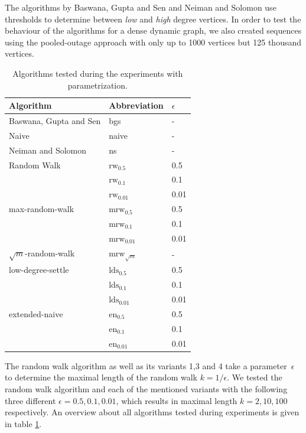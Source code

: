 \documentclass{article}      %
\begin{document}
The algorithms by Baswana, Gupta and Sen and Neiman and Solomon use thresholds to determine between \emph{low} and \emph{high} degree vertices. In order to test the behaviour of the algorithms for a dense dynamic graph, we also created sequences using the pooled-outage approach with only up to 1000 vertices but 125 thousand vertices. 

\begin{table}
	\centering
	\small
	\begin{tabular}{| l | l | l |}
		\hline
		Algorithm & Abbreviation & $\epsilon$ \\
		\hline
		\hline
		Baswana, Gupta and Sen & bgs & - \\
		Naive & naive & - \\
		Neiman and Solomon & ns & - \\
		Random Walk & $\mathrm{rw}_{0.5}$ & 0.5 \\
		 & $\mathrm{rw}_{0.1}$ & 0.1 \\
		 & $\mathrm{rw}_{0.01}$ & 0.01 \\
		max-random-walk & $\mathrm{mrw}_{0.5}$ & 0.5 \\
		 & $\mathrm{mrw}_{0.1}$ & 0.1 \\
		 & $\mathrm{mrw}_{0.01}$ & 0.01 \\
		$\sqrt{m}$-random-walk & $\mathrm{mrw}_{\sqrt{m}}$ & - \\
		low-degree-settle & $\mathrm{lds}_{0.5}$ & 0.5 \\
		 & $\mathrm{lds}_{0.1}$ & 0.1 \\
		 & $\mathrm{lds}_{0.01}$ & 0.01 \\
		extended-naive & $\mathrm{en}_{0.5}$ & 0.5 \\
		 & $\mathrm{en}_{0.1}$ & 0.1 \\
		 & $\mathrm{en}_{0.01}$ & 0.01 \\
		\hline
	\end{tabular}
	\caption{Algorithms tested during the experiments with parametrization.}
	\label{tab:algos}
\end{table}

The random walk algorithm as well as its variants 1,3 and 4 take a parameter~$\epsilon$ to determine the maximal length of the random walk $k=1/\epsilon$. We tested the random walk algorithm and each of the mentioned variants with the following three different $\epsilon=0.5,0.1,0.01$, which results in maximal length $k=2, 10, 100$ respectively. An overview about all algorithms tested during experiments is given in table \ref{tab:algos}.
\end{document}
